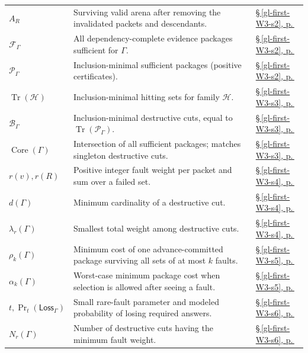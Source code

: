 \documentclass[11pt,letterpaper]{article}
\begin{document}
\begin{longtable}{@{}>{\raggedright\arraybackslash}p{.215\linewidth}>{\raggedright\arraybackslash}p{.585\linewidth}>{\raggedright\arraybackslash}p{.14\linewidth}@{}}
\textbf{$A_R$} & Surviving valid arena after removing the invalidated packets and descendants. & \hyperref[gl-first-W3-s2]{\S\,\ref*{gl-first-W3-s2}, p.\,\pageref*{gl-first-W3-s2}} \\
\textbf{$\mathcal F_\Gamma$} & All dependency-complete evidence packages sufficient for $\Gamma$. & \hyperref[gl-first-W3-s2]{\S\,\ref*{gl-first-W3-s2}, p.\,\pageref*{gl-first-W3-s2}} \\
\textbf{$\mathcal P_\Gamma$} & Inclusion-minimal sufficient packages (positive certificates). & \hyperref[gl-first-W3-s2]{\S\,\ref*{gl-first-W3-s2}, p.\,\pageref*{gl-first-W3-s2}} \\
\textbf{$\operatorname{Tr}(\mathcal H)$} & Inclusion-minimal hitting sets for family $\mathcal H$. & \hyperref[gl-first-W3-s3]{\S\,\ref*{gl-first-W3-s3}, p.\,\pageref*{gl-first-W3-s3}} \\
\textbf{$\mathcal B_\Gamma$} & Inclusion-minimal destructive cuts, equal to $\operatorname{Tr}(\mathcal P_\Gamma)$. & \hyperref[gl-first-W3-s3]{\S\,\ref*{gl-first-W3-s3}, p.\,\pageref*{gl-first-W3-s3}} \\
\textbf{$\operatorname{Core}(\Gamma)$} & Intersection of all sufficient packages; matches singleton destructive cuts. & \hyperref[gl-first-W3-s3]{\S\,\ref*{gl-first-W3-s3}, p.\,\pageref*{gl-first-W3-s3}} \\
\textbf{$r(v),r(R)$} & Positive integer fault weight per packet and sum over a failed set. & \hyperref[gl-first-W3-s4]{\S\,\ref*{gl-first-W3-s4}, p.\,\pageref*{gl-first-W3-s4}} \\
\textbf{$d(\Gamma)$} & Minimum cardinality of a destructive cut. & \hyperref[gl-first-W3-s4]{\S\,\ref*{gl-first-W3-s4}, p.\,\pageref*{gl-first-W3-s4}} \\
\textbf{$\lambda_r(\Gamma)$} & Smallest total weight among destructive cuts. & \hyperref[gl-first-W3-s4]{\S\,\ref*{gl-first-W3-s4}, p.\,\pageref*{gl-first-W3-s4}} \\
\textbf{$\rho_k(\Gamma)$} & Minimum cost of one advance-committed package surviving all sets of at most $k$ faults. & \hyperref[gl-first-W3-s5]{\S\,\ref*{gl-first-W3-s5}, p.\,\pageref*{gl-first-W3-s5}} \\
\textbf{$\alpha_k(\Gamma)$} & Worst-case minimum package cost when selection is allowed after seeing a fault. & \hyperref[gl-first-W3-s5]{\S\,\ref*{gl-first-W3-s5}, p.\,\pageref*{gl-first-W3-s5}} \\
\textbf{$t,\Pr_t(\mathsf{Loss}_\Gamma)$} & Small rare-fault parameter and modeled probability of losing required answers. & \hyperref[gl-first-W3-s6]{\S\,\ref*{gl-first-W3-s6}, p.\,\pageref*{gl-first-W3-s6}} \\
\textbf{$N_r(\Gamma)$} & Number of destructive cuts having the minimum fault weight. & \hyperref[gl-first-W3-s6]{\S\,\ref*{gl-first-W3-s6}, p.\,\pageref*{gl-first-W3-s6}} \\
\end{longtable}\endgroup
\clearpage
\end{document}
